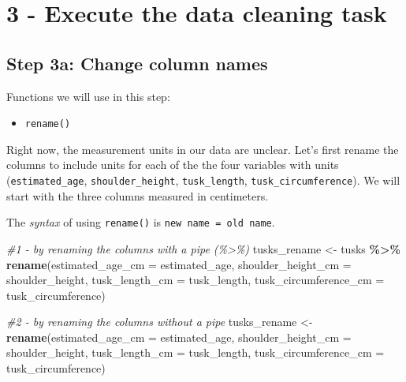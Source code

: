 \documentclass[
]{article}
\newenvironment{Shaded}{\begin{snugshade}}{\end{snugshade}}
\newcommand{\AttributeTok}[1]{\textcolor[rgb]{0.13,0.29,0.53}{#1}}
\newcommand{\CommentTok}[1]{\textcolor[rgb]{0.56,0.35,0.01}{\textit{#1}}}
\newcommand{\FunctionTok}[1]{\textcolor[rgb]{0.13,0.29,0.53}{\textbf{#1}}}
\newcommand{\NormalTok}[1]{#1}
\newcommand{\OtherTok}[1]{\textcolor[rgb]{0.56,0.35,0.01}{#1}}
\newcommand{\SpecialCharTok}[1]{\textcolor[rgb]{0.81,0.36,0.00}{\textbf{#1}}}
\providecommand{\tightlist}{%
  \setlength{\itemsep}{0pt}\setlength{\parskip}{0pt}}
\begin{document}
\section{3 - Execute the data cleaning
task}\label{execute-the-data-cleaning-task}

\subsection{\texorpdfstring{Step 3a: \textbf{Change column
names}}{Step 3a: Change column names}}\label{step-3a-change-column-names}

Functions we will use in this step:

\begin{itemize}
\tightlist
\item
  \texttt{rename()}
\end{itemize}

Right now, the measurement units in our data are unclear. Let's first
rename the columns to include units for each of the the four variables
with units (\texttt{estimated\_age}, \texttt{shoulder\_height},
\texttt{tusk\_length}, \texttt{tusk\_circumference}). We will start with
the three columns measured in centimeters.

The \emph{syntax} of using \texttt{rename()} is
\texttt{new\ name\ =\ old\ name}.

\begin{Shaded}
\begin{Highlighting}[]
\CommentTok{\#1 {-} by renaming the columns with a pipe (\%\textgreater{}\%)}
\NormalTok{tusks\_rename }\OtherTok{\textless{}{-}}\NormalTok{ tusks }\SpecialCharTok{\%\textgreater{}\%}
  \FunctionTok{rename}\NormalTok{(}\AttributeTok{estimated\_age\_cm =}\NormalTok{ estimated\_age, }\AttributeTok{shoulder\_height\_cm =}\NormalTok{ shoulder\_height, }\AttributeTok{tusk\_length\_cm =}\NormalTok{ tusk\_length, }\AttributeTok{tusk\_circumference\_cm =}\NormalTok{ tusk\_circumference)}

\CommentTok{\#2 {-} by renaming the columns without a pipe}
\NormalTok{tusks\_rename }\OtherTok{\textless{}{-}} \FunctionTok{rename}\NormalTok{(}\AttributeTok{estimated\_age\_cm =}\NormalTok{ estimated\_age, }\AttributeTok{shoulder\_height\_cm =}\NormalTok{ shoulder\_height, }\AttributeTok{tusk\_length\_cm =}\NormalTok{ tusk\_length, }\AttributeTok{tusk\_circumference\_cm =}\NormalTok{ tusk\_circumference)}
\end{Highlighting}
\end{Shaded}
\end{document}
